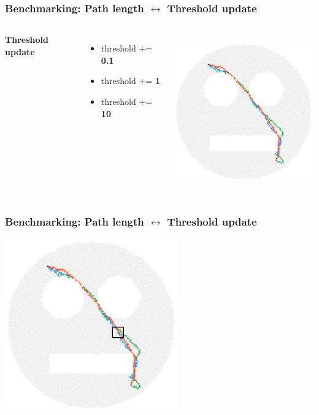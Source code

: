 \documentclass{beamer}
\begin{document}
\begin{frame}
\frametitle{Benchmarking: Path length $\leftrightarrow$ Threshold update}
\begin{columns}[c] %
\textbf{Threshold update}
\begin{itemize}
\item \textcolor{0.1}{threshold += \textbf{0.1}}
\item \textcolor{1}{threshold += \textbf{1}}
\item \textcolor{10}{threshold += \textbf{10}}
\end{itemize}

\begin{center}
	\includegraphics[height=190pt]{smileygraph.png}
\end{center}
\end{columns}
\end{frame}

\begin{frame}
\frametitle{Benchmarking: Path length $\leftrightarrow$ Threshold update}
\begin{center}
	\includegraphics[height=210pt]{smileygraph_zoom.png}
\end{center}
\end{frame}
\end{document}
